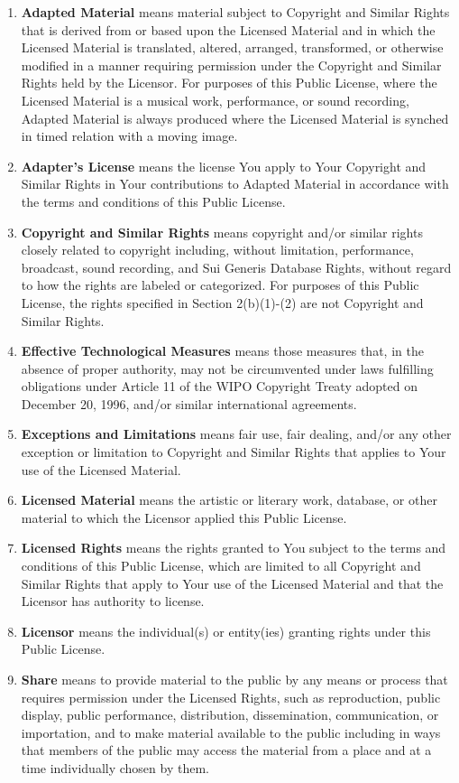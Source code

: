 \documentclass[a4paper, 12pt]{article}
\begin{document}
\begin{enumerate}[label=\alph*.]
\item \textbf{Adapted Material} means material subject to Copyright and Similar Rights that is derived from or based upon the Licensed Material and in which the Licensed Material is translated, altered, arranged, transformed, or otherwise modified in a manner requiring permission under the Copyright and Similar Rights held by the Licensor. For purposes of this Public License, where the Licensed Material is a musical work, performance, or sound recording, Adapted Material is always produced where the Licensed Material is synched in timed relation with a moving image.
\item \textbf{Adapter's License} means the license You apply to Your Copyright and Similar Rights in Your contributions to Adapted Material in accordance with the terms and conditions of this Public License.
\item \textbf{Copyright and Similar Rights} means copyright and/or similar rights closely related to copyright including, without limitation, performance, broadcast, sound recording, and Sui Generis Database Rights, without regard to how the rights are labeled or categorized. For purposes of this Public License, the rights specified in Section 2(b)(1)-(2) are not Copyright and Similar Rights.
\item \textbf{Effective Technological Measures} means those measures that, in the absence of proper authority, may not be circumvented under laws fulfilling obligations under Article 11 of the WIPO Copyright Treaty adopted on December 20, 1996, and/or similar international agreements.
\item \textbf{Exceptions and Limitations} means fair use, fair dealing, and/or any other exception or limitation to Copyright and Similar Rights that applies to Your use of the Licensed Material.
\item \textbf{Licensed Material} means the artistic or literary work, database, or other material to which the Licensor applied this Public License.
\item \textbf{Licensed Rights} means the rights granted to You subject to the terms and conditions of this Public License, which are limited to all Copyright and Similar Rights that apply to Your use of the Licensed Material and that the Licensor has authority to license.
\item \textbf{Licensor} means the individual(s) or entity(ies) granting rights under this Public License.
\item \textbf{Share} means to provide material to the public by any means or process that requires permission under the Licensed Rights, such as reproduction, public display, public performance, distribution, dissemination, communication, or importation, and to make material available to the public including in ways that members of the public may access the material from a place and at a time individually chosen by them.

\end{enumerate}
\end{document}
